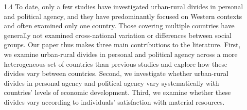 \documentclass[10pt, letterpaper]{article}
\begin{document}
\begin{spacing}{1.4}
To date, only a few studies have investigated urban-rural divides in personal and political agency, and they have predominantly focused on Western contexts and often examined only one country. Those covering multiple countries have generally not examined cross-national variation or differences between social groups. Our paper thus makes three main contributions to the literature. First, we examine urban-rural divides in personal and political agency across a more heterogeneous set of countries than previous studies and explore how these divides vary between countries. Second, we investigate whether urban-rural divides in personal agency and political agency vary systematically with countries' levels of economic development. Third, we examine whether these divides vary according to individuals' satisfaction with material resources.





\end{spacing}
\end{document}
